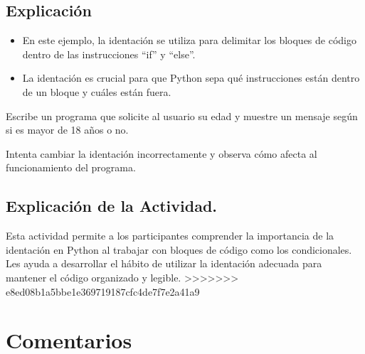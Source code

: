 \documentclass[
  a4paper,
  DIV=11,
  numbers=noendperiod,
  onepage,
  openany]{scrreprt}
\providecommand{\tightlist}{%
  \setlength{\itemsep}{0pt}\setlength{\parskip}{0pt}}\usepackage{longtable,booktabs,array}
\begin{document}
\hypertarget{explicaciuxf3n-7}{%
\section{Explicación}\label{explicaciuxf3n-7}}

\begin{itemize}
\tightlist
\item
  En este ejemplo, la identación se utiliza para delimitar los bloques
  de código dentro de las instrucciones ``if'' y ``else''.
\item
  La identación es crucial para que Python sepa qué instrucciones están
  dentro de un bloque y cuáles están fuera.
\end{itemize}

\begin{tcolorbox}[enhanced jigsaw, colbacktitle=quarto-callout-important-color!10!white, toprule=.15mm, leftrule=.75mm, titlerule=0mm, opacityback=0, rightrule=.15mm, opacitybacktitle=0.6, breakable, left=2mm, coltitle=black, title=\textcolor{quarto-callout-important-color}{\faExclamation}\hspace{0.5em}{Actividad Práctica:}, toptitle=1mm, bottomtitle=1mm, arc=.35mm, bottomrule=.15mm, colback=white, colframe=quarto-callout-important-color-frame]

Escribe un programa que solicite al usuario su edad y muestre un mensaje
según si es mayor de 18 años o no.

Intenta cambiar la identación incorrectamente y observa cómo afecta al
funcionamiento del programa.

\end{tcolorbox}

\hypertarget{explicaciuxf3n-de-la-actividad.-1}{%
\section{Explicación de la
Actividad.}\label{explicaciuxf3n-de-la-actividad.-1}}

Esta actividad permite a los participantes comprender la importancia de
la identación en Python al trabajar con bloques de código como los
condicionales. Les ayuda a desarrollar el hábito de utilizar la
identación adecuada para mantener el código organizado y legible.
\textgreater\textgreater\textgreater\textgreater\textgreater\textgreater\textgreater{}
e8ed08b1a5bbe1e369719187cfc4de7f7e2a41a9

\hypertarget{comentarios}{%
\chapter{Comentarios}\label{comentarios}}
\end{document}
